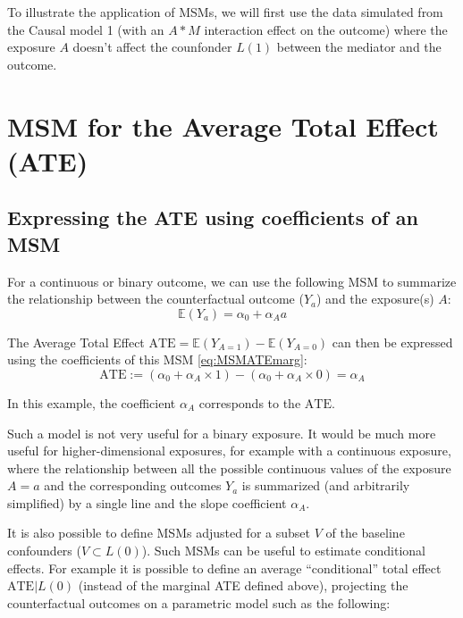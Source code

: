\documentclass[
]{book}
\begin{document}
To illustrate the application of MSMs, we will first use the data simulated from the Causal model 1 (with an \(A \ast M\) interaction effect on the outcome) where the exposure \(A\) doesn't affect the counfonder \(L(1)\) between the mediator and the outcome.

\hypertarget{msm_ATE_paragraph}{%
\section{MSM for the Average Total Effect (ATE)}\label{msm_ATE_paragraph}}

\hypertarget{expressing-the-ate-using-coefficients-of-an-msm}{%
\subsection{Expressing the ATE using coefficients of an MSM}\label{expressing-the-ate-using-coefficients-of-an-msm}}

For a continuous or binary outcome, we can use the following MSM to summarize the relationship between the counterfactual outcome (\(Y_a\)) and the exposure(s) \(A\):
\begin{equation} 
  \mathbb{E}(Y_a) = \alpha_0 + \alpha_A a 
  \label{eq:MSMATEmarg}
\end{equation}

The Average Total Effect \(\text{ATE} = \mathbb{E}(Y_{A=1}) - \mathbb{E}(Y_{A=0})\) can then be expressed using the coefficients of this MSM \eqref{eq:MSMATEmarg}:
\begin{equation*} 
  \text{ATE} := \left(\alpha_0 + \alpha_A \times 1 \right) - \left(\alpha_0 + \alpha_A \times 0 \right) = \alpha_A 
\end{equation*}

In this example, the coefficient \(\alpha_A\) corresponds to the \(\text{ATE}\).

Such a model is not very useful for a binary exposure. It would be much more useful for higher-dimensional exposures, for example with a continuous exposure, where the relationship between all the possible continuous values of the exposure \(A=a\) and the corresponding outcomes \(Y_a\) is summarized (and arbitrarily simplified) by a single line and the slope coefficient \(\alpha_A\).

It is also possible to define MSMs adjusted for a subset \(V\) of the baseline confounders (\(V \subset L(0)\)). Such MSMs can be useful to estimate conditional effects. For example it is possible to define an average ``conditional'' total effect \(\text{ATE}|L(0)\) (instead of the marginal ATE defined above), projecting the counterfactual outcomes on a parametric model such as the following:
\end{document}

